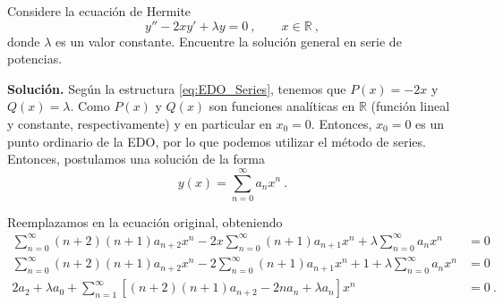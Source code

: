\begin{ejemplo}
    Considere la ecuación de Hermite
    \begin{equation}
        y'' - 2x y' + \lambda y = 0 \ , \qquad x \in \mathbb{R} \ ,
    \end{equation}
    donde $\lambda$ es un valor constante. Encuentre la solución general en serie de potencias.

    \textbf{Solución.} Según la estructura \eqref{eq:EDO_Series}, tenemos que $P(x) = -2x$ y $Q(x) = \lambda$. Como $P(x)$ y $Q(x)$ son funciones analíticas en $\mathbb{R}$ (función lineal y constante, respectivamente) y en particular en $x_0 = 0$. Entonces, $x_0 = 0$ es un punto ordinario de la EDO, por lo que podemos utilizar el método de series. Entonces, postulamos una solución de la forma
    \begin{equation}
        y(x) = \sum_{n=0}^\infty a_n x^n \ .
    \end{equation}

    Reemplazamos en la ecuación original, obteniendo
    \begin{align}
        \sum_{n=0}^\infty (n+2)(n+1)a_{n+2}x^n - 2x \sum_{n=0}^\infty (n+1) a_{n+1}x^n + \lambda \sum_{n=0}^\infty a_n x^n & = 0 \\
        \sum_{n=0}^\infty (n+2)(n+1)a_{n+2}x^n - 2 \sum_{n=0}^\infty (n+1) a_{n+1}x^n+1 + \lambda \sum_{n=0}^\infty a_n x^n & = 0 \\
        2 a_2 + \lambda a_0 + \sum_{n=1}^\infty [(n+2)(n+1)a_{n+2} - 2na_n + \lambda a_n]x^n & = 0 \ .
    \end{align}


\end{ejemplo}
